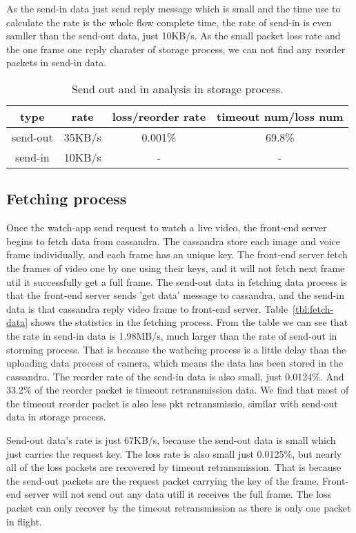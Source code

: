 As the send-in data just send reply message which is small and the time use to calculate the rate is the whole flow complete time, the rate of send-in is even samller than the send-out data, just 10KB/s. As the small packet loss rate and the one frame one reply charater of storage process, we can not find any reorder packets in send-in data.         

\begin{table}[ht]
\tablefontsize
\renewcommand{\arraystretch}{\assize}
 \setlength{\tabcolsep}{3pt}
\caption{Send out and in analysis in storage process.}
\centering
\begin{tabular}{c|c|c|c}
	\toprule
	 type & rate & loss/reorder rate & timeout num/loss num \\
	\hline
	send-out & 35KB/s & 0.001\% & 69.8\% \\
	\hline
	send-in & 10KB/s & - & - \\
	\bottomrule
\end{tabular}
\label{tbl:storage-data}
\termspace
\end{table} 

\subsection{Fetching process}
\label{sub:fetch}

Once the watch-app send request to watch a live video, the front-end server begins to fetch data from cassandra. The cassandra store each image and voice frame individually, and each frame has an unique key. The front-end server fetch the frames of video one by one using their keys, and it will not fetch next frame util it successfully get a full frame. The send-out data in fetching data process is that the front-end server sends 'get data' message to cassandra, and the send-in data is that cassandra reply video frame to front-end server. Table~\ref{tbl:fetch-data} shows the statistics in the fetching process. From the table we can see that the rate in send-in data is 1.98MB/s, much larger than the rate of send-out in storming process. That is because the wathcing process is a little delay than the uploading data process of camera, which means the data has been stored in the cassandra. The reorder rate of the send-in data is also small, just 0.0124\%. And 33.2\% of the reorder packet is timeout retransmission data. We find that most of the timeout reorder packet is also less pkt retransmissio, similar with send-out data in storage process.

Send-out data's rate is just 67KB/s, because the send-out data is small which just carries the request key. The loss rate is also small just 0.0125\%, but nearly all of the loss packets are recovered by timeout retransmission. That is because the send-out packets are the request packet carrying the key of the frame. Front-end server will not send out any data utill it receives the full frame. The loss packet can only recover by the timeout retransmission as there is only one packet in flight.  

